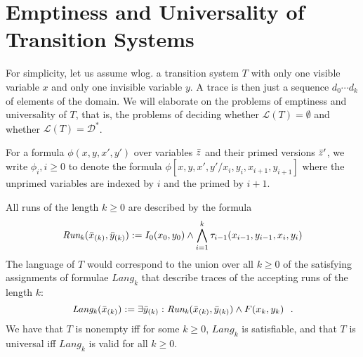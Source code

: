 \documentclass[10pt]{llncs}
\newcommand{\subst}[3]{#1[#2/#3]}
\newcommand{\Language}[1]{\mathit{Lang_{#1}}}
\newcommand{\Run}[1]{\mathit{Run_{#1}}}
\newcommand{\domain}{\mathcal {D}}
\newcommand{\lang}{\mathcal {L}}
\newcommand{\Xobs}{\vect{x}}
\newcommand{\Xinv}{\vect{y}}
\newcommand{\Xinvz}{\vect{z}}
\newcommand{\initial}{I}
\newcommand{\final}{F}
\newcommand{\transition}{\tau}
\newcommand{\fdef}{\mathrel{:=}}
\begin{document}

\newpage
\section{Emptiness and Universality of Transition Systems}
For simplicity, let us assume wlog. a transition system $T$ with only one visible variable $x$ and only one invisible variable $y$.
A trace is then just a sequence $d_0\cdots d_k$ of elements of the domain.
%
We will elaborate on the problems of emptiness and universality of $T$, that is, the problems of deciding whether $\lang(T) = \emptyset$ and  whether $\lang(T) = \domain^*$.

For a formula $\phi(x,y,x',y')$ over variables $\vect{z}$ and their primed versions $\vect z'$, we write $\phi_i,i\geq 0$ to denote the formula $\subst{\phi}{x,y,x',y'}{x_i,y_i,x_{i+1},y_{i+1}}$ where the unprimed variables are indexed by $i$ and the primed by $i+1$.
%

All runs of the length $k\geq 0$ are described by the formula 
$$
\Run k(\vect x[k],\vect y[k]) \fdef
\initial_0(x_0,y_0) \land \bigwedge_{i=1}^{k} \tau_{i-1}(x_{i-1},y_{i-1},x_{i},y_{i})
$$
The language of $T$ would correspond to the union over all $k\geq 0$ of the satisfying assignments of formulae $\Language k$  that describe traces of the accepting runs of the length $k$:  
$$
\Language k(\vect x[k]) \fdef  \exists \vect y[k]:\Run k(\vect x[k],\vect y[k]) \land \final(x_k,y_k) \ \ .
$$
%
We have that $T$ is nonempty iff for some $k\geq 0$, $\Language k$ is satisfiable,
 and that $T$ is universal iff $\Language k$ is valid for all $k\geq 0$.
\end{document}
